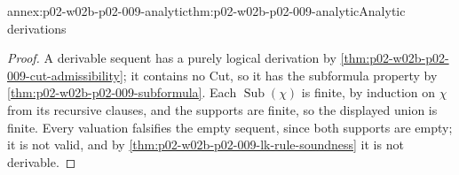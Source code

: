 \begin{annexitem}{annex:p02-w02b-p02-009-analytic}{thm:p02-w02b-p02-009-analytic}{Analytic derivations}
\begin{proof}
A derivable sequent has a purely logical derivation by
\cref{thm:p02-w02b-p02-009-cut-admissibility}; it contains no Cut, so it has
the subformula property by \cref{thm:p02-w02b-p02-009-subformula}.  Each
\(\operatorname{Sub}(\chi)\) is finite, by induction on \(\chi\) from its
recursive clauses, and the supports are finite, so the displayed union is
finite.  Every valuation falsifies the empty sequent, since both supports are
empty; it is not valid, and by
\cref{thm:p02-w02b-p02-009-lk-rule-soundness} it is not derivable.
\end{proof}
\end{annexitem}

